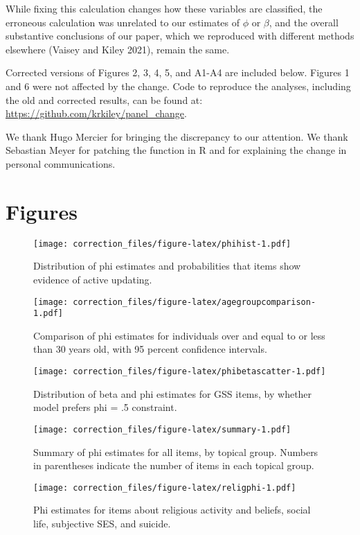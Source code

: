 \documentclass[
]{article}
\begin{document}
While fixing this calculation changes how these variables are
classified, the erroneous calculation was unrelated to our estimates of
\(\phi\) or \(\beta\), and the overall substantive conclusions of our
paper, which we reproduced with different methods elsewhere (Vaisey and
Kiley 2021), remain the same.

Corrected versions of Figures 2, 3, 4, 5, and A1-A4 are included below.
Figures 1 and 6 were not affected by the change. Code to reproduce the
analyses, including the old and corrected results, can be found at:
\url{https://github.com/krkiley/panel_change}.

We thank Hugo Mercier for bringing the discrepancy to our attention. We
thank Sebastian Meyer for patching the function in R and for explaining
the change in personal communications.

\hypertarget{figures}{%
\section{Figures}\label{figures}}

\begin{figure}
\centering
\texttt{[image: correction\_files/figure-latex/phihist-1.pdf]}
\caption{Distribution of phi estimates and probabilities that items show
evidence of active updating.}
\end{figure}

\begin{figure}
\centering
\texttt{[image: correction\_files/figure-latex/agegroupcomparison-1.pdf]}
\caption{Comparison of phi estimates for individuals over and equal to
or less than 30 years old, with 95 percent confidence intervals.}
\end{figure}

\begin{figure}
\centering
\texttt{[image: correction\_files/figure-latex/phibetascatter-1.pdf]}
\caption{Distribution of beta and phi estimates for GSS items, by
whether model prefers phi = .5 constraint.}
\end{figure}

\begin{figure}
\centering
\texttt{[image: correction\_files/figure-latex/summary-1.pdf]}
\caption{Summary of phi estimates for all items, by topical group.
Numbers in parentheses indicate the number of items in each topical
group.}
\end{figure}

\begin{figure}
\centering
\texttt{[image: correction\_files/figure-latex/religphi-1.pdf]}
\caption{Phi estimates for items about religious activity and beliefs,
social life, subjective SES, and suicide.}
\end{figure}
\end{document}
